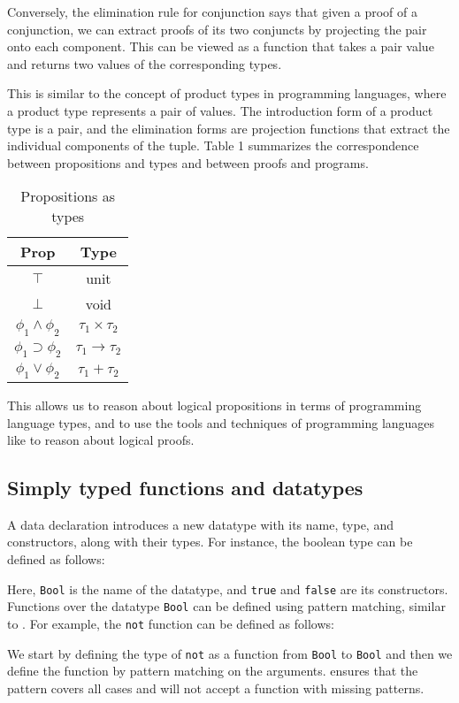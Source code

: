 \documentclass[titlepage]{article}
\begin{document}
Conversely, the elimination rule for conjunction says that given a proof of a conjunction, we can extract proofs of its two conjuncts by projecting the pair onto each component. This can be viewed as a function that takes a pair value and returns two values of the corresponding types.

This is similar to the concept of product types in programming languages, where a product type represents a pair of values. The introduction form of a product type is a pair, and the elimination forms are projection functions that extract the individual components of the tuple. Table 1 summarizes the correspondence between propositions and types and between proofs and programs.

\begin{table}[h!]
    \centering
    \begin{tabular}{c | c}
        Prop & Type \\
        \hline
        $\top$ & unit \\
        $\bot$ & void \\
        $\phi_1 \wedge \phi_2$ & $\tau_1 \times \tau_2$ \\
        $\phi_1 \supset \phi_2$ & $\tau_1 \to \tau_2$ \\
        $\phi_1 \vee \phi_2$ & $\tau_1 + \tau_2$
    \end{tabular}
    \caption{Propositions as types}
\end{table}

This allows us to reason about logical propositions in terms of programming language types, and to use the tools and techniques of programming languages like \Agda to reason about logical proofs.


\subsection{Simply typed functions and datatypes}

A data declaration introduces a new datatype with its name, type, and constructors, along with their types. For instance, the boolean type can be defined as follows:

Here, \texttt{Bool} is the name of the datatype, and \texttt{true} and \texttt{false} are its constructors. Functions over the datatype \texttt{Bool} can be defined using pattern matching, similar to \Haskell. For example, the \texttt{not} function can be defined as follows:

We start by defining the type of \texttt{not} as a function from \texttt{Bool} to \texttt{Bool} and then we define the function by pattern matching on the arguments. \Agda ensures that the pattern covers all cases and will not accept a function with missing patterns.
\end{document}
